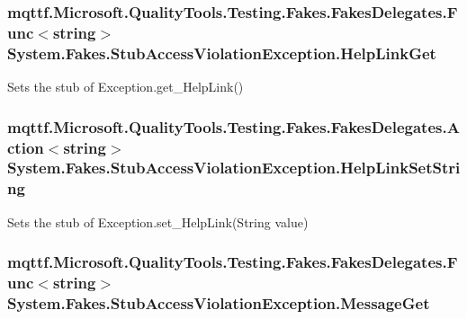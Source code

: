 \hypertarget{class_system_1_1_fakes_1_1_stub_access_violation_exception_ab09bcf0ff1e5329f28eebc78310ef4c6}{
\subsubsection[{Help\-Link\-Get}]{\setlength{\rightskip}{0pt plus 5cm}mqttf.\-Microsoft.\-Quality\-Tools.\-Testing.\-Fakes.\-Fakes\-Delegates.\-Func$<$string$>$ System.\-Fakes.\-Stub\-Access\-Violation\-Exception.\-Help\-Link\-Get}}\label{class_system_1_1_fakes_1_1_stub_access_violation_exception_ab09bcf0ff1e5329f28eebc78310ef4c6}


Sets the stub of Exception.\-get\-\_\-\-Help\-Link()

\hypertarget{class_system_1_1_fakes_1_1_stub_access_violation_exception_a569e3f3a362ce1daf4efc67a6b1bb92c}{
\subsubsection[{Help\-Link\-Set\-String}]{\setlength{\rightskip}{0pt plus 5cm}mqttf.\-Microsoft.\-Quality\-Tools.\-Testing.\-Fakes.\-Fakes\-Delegates.\-Action$<$string$>$ System.\-Fakes.\-Stub\-Access\-Violation\-Exception.\-Help\-Link\-Set\-String}}\label{class_system_1_1_fakes_1_1_stub_access_violation_exception_a569e3f3a362ce1daf4efc67a6b1bb92c}


Sets the stub of Exception.\-set\-\_\-\-Help\-Link(\-String value)

\hypertarget{class_system_1_1_fakes_1_1_stub_access_violation_exception_a69121f85b62c716a4753ddd5e45bc7b4}{
\subsubsection[{Message\-Get}]{\setlength{\rightskip}{0pt plus 5cm}mqttf.\-Microsoft.\-Quality\-Tools.\-Testing.\-Fakes.\-Fakes\-Delegates.\-Func$<$string$>$ System.\-Fakes.\-Stub\-Access\-Violation\-Exception.\-Message\-Get}}\label{class_system_1_1_fakes_1_1_stub_access_violation_exception_a69121f85b62c716a4753ddd5e45bc7b4}


